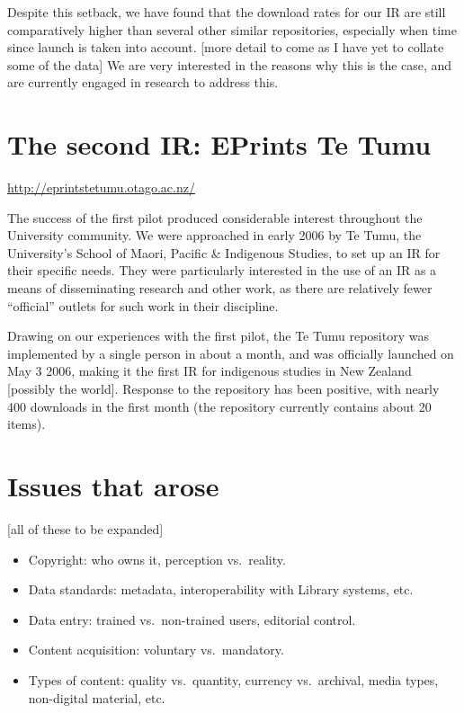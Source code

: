 \documentclass[12pt,pdftex,a4paper,titlepage]{article}
\begin{document}
Despite this setback, we have found that the download rates for our IR are still comparatively higher than several other similar repositories, especially when time since launch is taken into account. [more detail to come as I have yet to collate some of the data] We are very interested in the reasons why this is the case, and are currently engaged in research to address this.


\section{The second IR: EPrints Te Tumu}

\url{http://eprintstetumu.otago.ac.nz/}

The success of the first pilot produced considerable interest throughout the University community. We were approached in early 2006 by Te Tumu, the University's School of Maori, Pacific \& Indigenous Studies, to set up an IR for their specific needs. They were particularly interested in the use of an IR as a means of disseminating research and other work, as there are relatively fewer ``official'' outlets for such work in their discipline.

Drawing on our experiences with the first pilot, the Te Tumu repository was implemented by a single person in about a month, and was officially launched on May 3 2006, making it the first IR for indigenous studies in New Zealand [possibly the world]. Response to the repository has been positive, with nearly 400 downloads in the first month (the repository currently contains about 20 items).


\section{Issues that arose}

[all of these to be expanded]

\begin{itemize}

	\item Copyright: who owns it, perception vs.\ reality.

	\item Data standards: metadata, interoperability with Library systems, etc.

	\item Data entry: trained vs.\ non-trained users, editorial control.

	\item Content acquisition: voluntary vs.\ mandatory.

	\item Types of content: quality vs.\ quantity, currency vs.\ archival, media types, non-digital material, etc.

\end{itemize}
\end{document}

